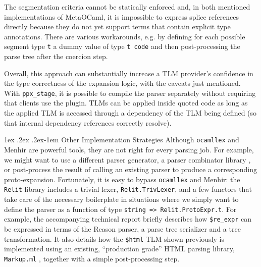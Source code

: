 \documentclass[acmsmall]{acmart}
\makeatletter
\renewcommand{\subsubsection}{%
  \@startsection{subsubsection}{3}%
  {\z@}{1ex \@plus .2ex \@minus .2ex}{-1em}%
  {\normalfont\normalsize\bfseries}%
}
\newcommand{\li}[1]{\lstinline[basicstyle=\ttfamily\fontsize{9pt}{1em}\selectfont]{#1}}
\makeatother
\begin{document}
The segmentation criteria cannot be statically enforced and, in both mentioned implementations of MetaOCaml, it is impossible to express splice references directly because they do not yet support terms that contain explicit type annotations. There are various workarounds, e.g. by defining for each possible segment type \li{t} a dummy value of type \li{t code} and then post-processing the parse tree after the coercion step. 

Overall, this approach can substantially increase a TLM provider's confidence in the type correctness of the expansion logic, with the caveats just mentioned. With \li{ppx_stage}, it is possible to compile the parser separately without requiring that clients use the plugin. 
TLMs can be applied inside quoted code as long as the applied TLM is accessed through a dependency of the TLM being defined (so that internal dependency references correctly resolve). %

\subsubsection{Other Implementation Strategies}
\label{sec:html-example}
Although \li{ocamllex} and Menhir are powerful tools, they are not right for every parsing job. For example, we might want to use a different parser generator, a parser combinator library \cite{Hutton1992d}, or post-process the result of calling an existing parser to produce a corresponding proto-expansion. Fortunately, it is easy to bypass \li{ocamllex} and Menhir: 
the \li{Relit} library includes a trivial lexer, \li{Relit.TrivLexer}, and a few functors that take care of the necessary boilerplate in situations where we simply want to define the parser as a function of type \li{string => Relit.ProtoExpr.t}. For example, the accompanying technical report briefly describes how \li{$re_expr} can be expressed in terms of the Reason parser, a parse tree serializer and a tree transformation. It also details how the \li{$html} TLM shown previously is implemented using an existing, ``production grade'' HTML parsing library, \li{Markup.ml} \cite{markupml}, together with a simple post-processing step.
\end{document}

